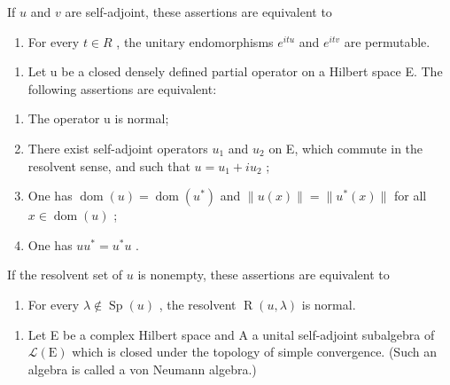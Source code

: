 If \(u\) and \(v\) are self-adjoint, these assertions are equivalent to

\begin{enumerate}
\def\labelenumi{\alph{enumi})}
\setcounter{enumi}{3}
\tightlist
\item
  For every \(t \in R\) , the unitary endomorphisms \(e^{itu}\) and \(e^{itv}\) are permutable.
\end{enumerate}

\begin{enumerate}
\def\labelenumi{\arabic{enumi})}
\setcounter{enumi}{8}
\tightlist
\item
  Let u be a closed densely defined partial operator on a Hilbert space E. The following assertions are equivalent:
\end{enumerate}

\begin{enumerate}
\def\labelenumi{\alph{enumi})}
\item
  The operator u is normal;
\item
  There exist self-adjoint operators \(u_{1}\) and \(u_{2}\) on E, which commute in the resolvent sense, and such that \(u = u_{1} + iu_{2}\) ;
\item
  One has \(\operatorname{dom}(u) = \operatorname{dom}(u^*)\) and \(\| u(x)\| = \| u^{*}(x)\|\) for all \(x\in \operatorname{dom}(u)\) ;
\item
  One has \(uu^{*} = u^{*}u\) .
\end{enumerate}

If the resolvent set of \(u\) is nonempty, these assertions are equivalent to

\begin{enumerate}
\def\labelenumi{\alph{enumi})}
\setcounter{enumi}{4}
\tightlist
\item
  For every \(\lambda \notin \operatorname{Sp}(u)\) , the resolvent \(\operatorname{R}(u, \lambda)\) is normal.
\end{enumerate}

\begin{enumerate}
\def\labelenumi{\arabic{enumi})}
\setcounter{enumi}{9}
\tightlist
\item
  Let E be a complex Hilbert space and A a unital self-adjoint subalgebra of \(\mathcal{L}(\mathrm{E})\) which is closed under the topology of simple convergence. (Such an algebra is called a von Neumann algebra.)
\end{enumerate}

